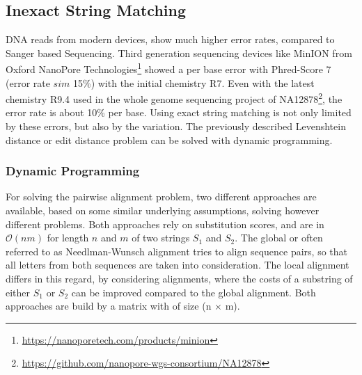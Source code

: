 \subsection{Inexact String Matching}
DNA reads from modern devices, show much higher error rates, compared to Sanger based Sequencing. Third generation sequencing devices like MinION from Oxford NanoPore Technologies\footnote{\url{https://nanoporetech.com/products/minion}} showed a per base error with Phred-Score 7 (error rate $sim$ 15\%) with the initial chemistry R7. Even with the latest chemistry R9.4 used in the whole genome sequencing project of NA12878\footnote{\url{https://github.com/nanopore-wgs-consortium/NA12878}}, the error rate is about 10\% per base. Using exact string matching is not only limited by these errors, but also by the variation. The previously described Levenshtein distance or edit distance problem can be solved with  dynamic programming.      
\label{inexact}
\subsubsection{Dynamic Programming}
For solving the pairwise alignment problem, two different approaches are available, based on some similar underlying assumptions, solving however different problems. Both approaches rely on substitution scores, and are in  $\mathcal{O}({n m})$ for length $n$ and $m$ of two strings $S_1$ and $S_2$. The global or often referred to as Needlman-Wunsch alignment tries to align sequence pairs, so that all letters from both sequences are taken into consideration. The local alignment differs in this regard, by considering alignments, where the costs of a substring of either $S_1$ or $S_2$ can be improved compared to the global alignment. Both approaches are build by a matrix with of size (n $\times $ m).
